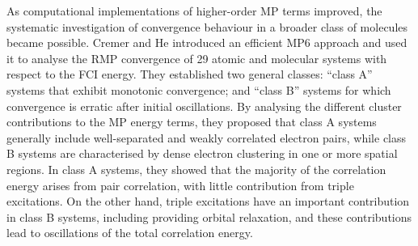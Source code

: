 \documentclass[aps,prb,reprint,noshowkeys,linenumbers,superscriptaddress]{revtex4-1}
\newcommand{\hugh}[1]{\textcolor{hughgreen}{#1}}
\begin{document}
\hugh{As computational implementations of higher-order MP terms improved, the systematic investigation 
of convergence behaviour in a broader class of molecules became possible.}
Cremer and He \hugh{introduced an efficient MP6 approach and used it to analyse the RMP convergence of}
29 atomic and molecular systems with respect to the FCI energy.\cite{Cremer_1996}
They established two general classes: ``class A'' systems that exhibit monotonic convergence; 
and ``class B'' systems for which convergence is erratic after initial oscillations. 
\hugh{By analysing the different cluster contributions to the MP energy terms, they proposed that
class A systems generally include well-separated and weakly correlated electron pairs, while class B systems
are characterised by dense electron clustering in one or more spatial regions.}\cite{Cremer_1996}
In class A systems, they showed that the majority of the correlation energy arises from pair correlation, 
with little contribution from triple excitations.
On the other hand, triple excitations have an important contribution in class B systems, including providing
orbital relaxation, and these contributions lead to oscillations of the total correlation energy.
\end{document}
